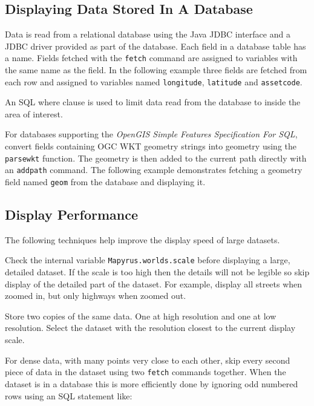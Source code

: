 \subsection{Displaying Data Stored In A Database}

Data is read from a relational database using
the Java JDBC interface and a JDBC driver provided
as part of the database.
Each field in a database table has a name.
Fields fetched with the
\texttt{fetch}
command are assigned to variables with the same name as the field.
In the following example three fields are fetched from each
row and assigned to variables named
\texttt{longitude}, \texttt{latitude} and \texttt{assetcode}.

An SQL where clause is used to limit data read from
the database to inside the area of interest.



For databases supporting the \textit{OpenGIS Simple Features Specification For
SQL}, convert fields containing OGC WKT geometry strings
into geometry using the \texttt{parsewkt}
function.  The geometry is then added to the current
path directly with an \texttt{addpath} command.  The
following example demonstrates fetching a geometry field named \texttt{geom}
from the database and displaying it.



\subsection{Display Performance}

The following techniques help improve the display speed of large datasets.

Check the internal variable \texttt{Mapyrus.worlds.scale} before displaying a
large, detailed dataset.  If the scale is too high then the details will not be
legible so skip display of the detailed part of the dataset.  For example,
display all streets when zoomed in, but only highways when zoomed out.

Store two copies of the same data.  One at high resolution and one at low
resolution.  Select the dataset with the resolution closest to the current
display scale.

For dense data, with many points very close to each other, skip every second
piece of data in the dataset using two \texttt{fetch} commands together.  When
the dataset is in a database this is more efficiently done by ignoring odd
numbered rows using an SQL statement like:

